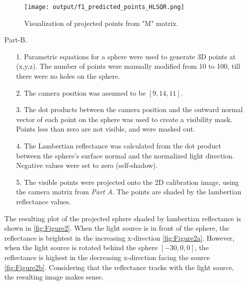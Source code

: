 \documentclass[12pt]{report}
\begin{document}
\begin{enumerate}
    \begin{figure}[H]
        \centering
        \texttt{[image: output/f1\_predicted\_points\_HLSQR.png]}
        \caption{Visualization of projected points from "M" matrix.}
        \label{fig:Figure1}
    \end{figure}

    \FloatBarrier 

    \item[Part-B.]
    \ \\
    \begin{enumerate}
        \item[1.] Parametric equations for a sphere were used to generate 3D points at (x,y,z). The number of points were manually modified from 10 to 
        100, till there were no holes on the sphere.
        \item[2.] The camera position was assumed to be $[9, 14, 11]$.
        \item[3.] The dot products between the camera position and the outward normal vector of each point on the sphere was used to create a visibility 
        mask. Points less than zero are not visible, and were masked out.
        \item[4.] The Lambertian reflectance was calculated from the dot product between the sphere's surface normal and the normalized light direction. 
        Negative values were set to zero (self-shadow).
        \item[5.] The visible points were projected onto the 2D calibration image, using the camera matrix from \emph{Part A}. The points are shaded by 
        the lambertian reflectance values.
    \end{enumerate}
    The resulting plot of the projected sphere shaded by lambertian reflectance is shown in \autoref{fig:Figure2}. When the light source is in front of 
    the sphere, the reflectance is brightest in the increasing x-direction \autoref{fig:Figure2a}. However, when the light source is rotated behind the 
    sphere $[-30, 0, 0]$, the reflectance is highest in the decreasing x-direction facing the source \autoref{fig:Figure2b}. Considering that the reflectance 
    tracks with the light source, the resulting image makes sense.


\end{enumerate}
\end{document}
